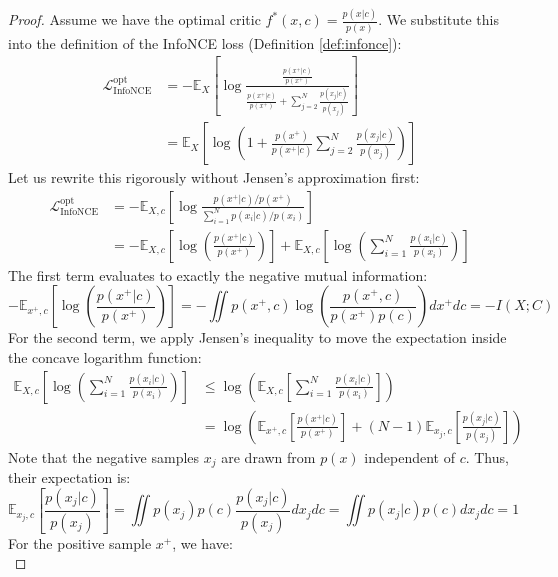 \begin{proof}
Assume we have the optimal critic $f^*(x, c) = \frac{p(x|c)}{p(x)}$. We substitute this into the definition of the InfoNCE loss (Definition \ref{def:infonce}):
\begin{align*}
    \mathcal{L}_{\text{InfoNCE}}^{\text{opt}} &= - \mathbb{E}_{X} \left[ \log \frac{ \frac{p(x^+|c)}{p(x^+)} }{ \frac{p(x^+|c)}{p(x^+)} + \sum_{j=2}^N \frac{p(x_j|c)}{p(x_j)} } \right] \\
    &= \mathbb{E}_{X} \left[ \log \left( 1 + \frac{p(x^+)}{p(x^+|c)} \sum_{j=2}^N \frac{p(x_j|c)}{p(x_j)} \right) \right]
\end{align*}
Let us rewrite this rigorously without Jensen's approximation first:
\begin{align*}
    \mathcal{L}_{\text{InfoNCE}}^{\text{opt}} &= - \mathbb{E}_{X, c} \left[ \log \frac{ p(x^+|c)/p(x^+) }{ \sum_{i=1}^N p(x_i|c)/p(x_i) } \right] \\
    &= - \mathbb{E}_{X, c} \left[ \log \left( \frac{p(x^+|c)}{p(x^+)} \right) \right] + \mathbb{E}_{X, c} \left[ \log \left( \sum_{i=1}^N \frac{p(x_i|c)}{p(x_i)} \right) \right]
\end{align*}
The first term evaluates to exactly the negative mutual information:
\begin{equation}
    - \mathbb{E}_{x^+, c} \left[ \log \left( \frac{p(x^+|c)}{p(x^+)} \right) \right] = - \iint p(x^+, c) \log \left( \frac{p(x^+, c)}{p(x^+)p(c)} \right) dx^+ dc = - I(X; C)
\end{equation}
For the second term, we apply Jensen's inequality to move the expectation inside the concave logarithm function:
\begin{align*}
    \mathbb{E}_{X, c} \left[ \log \left( \sum_{i=1}^N \frac{p(x_i|c)}{p(x_i)} \right) \right] &\le \log \left( \mathbb{E}_{X, c} \left[ \sum_{i=1}^N \frac{p(x_i|c)}{p(x_i)} \right] \right) \\
    &= \log \left( \mathbb{E}_{x^+, c} \left[ \frac{p(x^+|c)}{p(x^+)} \right] + (N-1) \mathbb{E}_{x_j, c} \left[ \frac{p(x_j|c)}{p(x_j)} \right] \right)
\end{align*}
Note that the negative samples $x_j$ are drawn from $p(x)$ independent of $c$. Thus, their expectation is:
\begin{equation}
    \mathbb{E}_{x_j, c} \left[ \frac{p(x_j|c)}{p(x_j)} \right] = \iint p(x_j) p(c) \frac{p(x_j|c)}{p(x_j)} dx_j dc = \iint p(x_j|c) p(c) dx_j dc = 1
\end{equation}
For the positive sample $x^+$, we have:
\begin{equation}

\end{equation}
\end{proof}
